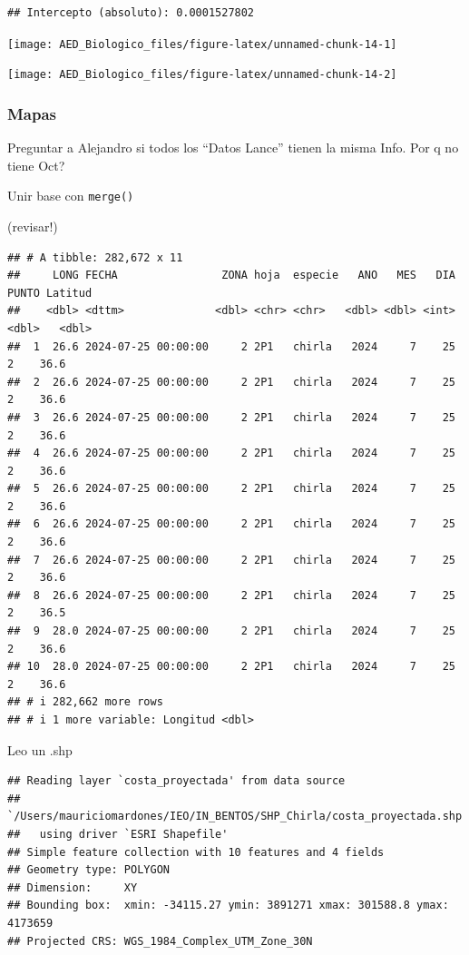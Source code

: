 \documentclass[
]{article}
\begin{document}
\begin{verbatim}
## Intercepto (absoluto): 0.0001527802
\end{verbatim}

\begin{center}\texttt{[image: AED\_Biologico\_files/figure-latex/unnamed-chunk-14-1]} \end{center}

\begin{center}\texttt{[image: AED\_Biologico\_files/figure-latex/unnamed-chunk-14-2]} \end{center}

\hypertarget{mapas}{%
\subsubsection{Mapas}\label{mapas}}

Preguntar a Alejandro si todos los ``Datos Lance'' tienen la misma Info. Por q no tiene Oct?

Unir base con \texttt{merge()}

(revisar!)

\begin{verbatim}
## # A tibble: 282,672 x 11
##     LONG FECHA                ZONA hoja  especie   ANO   MES   DIA PUNTO Latitud
##    <dbl> <dttm>              <dbl> <chr> <chr>   <dbl> <dbl> <int> <dbl>   <dbl>
##  1  26.6 2024-07-25 00:00:00     2 2P1   chirla   2024     7    25     2    36.6
##  2  26.6 2024-07-25 00:00:00     2 2P1   chirla   2024     7    25     2    36.6
##  3  26.6 2024-07-25 00:00:00     2 2P1   chirla   2024     7    25     2    36.6
##  4  26.6 2024-07-25 00:00:00     2 2P1   chirla   2024     7    25     2    36.6
##  5  26.6 2024-07-25 00:00:00     2 2P1   chirla   2024     7    25     2    36.6
##  6  26.6 2024-07-25 00:00:00     2 2P1   chirla   2024     7    25     2    36.6
##  7  26.6 2024-07-25 00:00:00     2 2P1   chirla   2024     7    25     2    36.6
##  8  26.6 2024-07-25 00:00:00     2 2P1   chirla   2024     7    25     2    36.5
##  9  28.0 2024-07-25 00:00:00     2 2P1   chirla   2024     7    25     2    36.6
## 10  28.0 2024-07-25 00:00:00     2 2P1   chirla   2024     7    25     2    36.6
## # i 282,662 more rows
## # i 1 more variable: Longitud <dbl>
\end{verbatim}

Leo un .shp

\begin{verbatim}
## Reading layer `costa_proyectada' from data source 
##   `/Users/mauriciomardones/IEO/IN_BENTOS/SHP_Chirla/costa_proyectada.shp' 
##   using driver `ESRI Shapefile'
## Simple feature collection with 10 features and 4 fields
## Geometry type: POLYGON
## Dimension:     XY
## Bounding box:  xmin: -34115.27 ymin: 3891271 xmax: 301588.8 ymax: 4173659
## Projected CRS: WGS_1984_Complex_UTM_Zone_30N
\end{verbatim}
\end{document}
